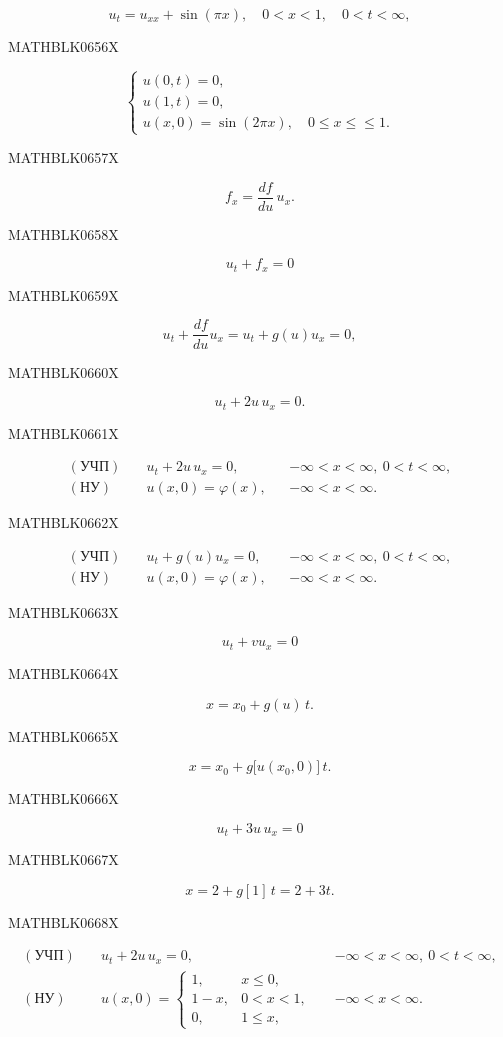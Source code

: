 \documentclass[
  ukrainian,
]{article}
\begin{document}
\[
u_t = u_{xx} + \sin(\pi x), \quad 0 < x < 1, \quad 0 < t < \infty,
\]

MATHBLK0656X

\[
\begin{cases} u(0, t) = 0, \\ u(1, t) = 0, \\ u(x, 0) = \sin(2\pi x), \quad 0 \le x \le \le 1. \end{cases}
\]

MATHBLK0657X

\[
f_x=\frac{df}{du}\,u_x.
\]

MATHBLK0658X

\[
u_t + f_x = 0
\]

MATHBLK0659X

\[
u_t + \frac{df}{du}u_x = u_t + g(u)u_x = 0,
\]

MATHBLK0660X

\[
u_t + 2u\,u_x = 0.
\]

MATHBLK0661X

\[
\begin{aligned}
(\text{УЧП})\quad & u_t + 2u\,u_x = 0, && -\infty < x < \infty,\ 0 < t < \infty, \\
(\text{НУ})\quad & u(x,0)=\varphi(x), && -\infty < x < \infty.
\end{aligned}
\]

MATHBLK0662X

\[
\begin{aligned}
(\text{УЧП})\quad & u_t + g(u)u_x = 0, && -\infty < x < \infty,\ 0 < t < \infty, \\
(\text{НУ})\quad & u(x,0)=\varphi(x), && -\infty < x < \infty.
\end{aligned}
\]

MATHBLK0663X

\[
u_t + v u_x = 0
\]

MATHBLK0664X

\[
x = x_0 + g(u)\,t.
\]

MATHBLK0665X

\[
x = x_0 + g\!\bigl[u(x_0,0)\bigr]\,t.
\]

MATHBLK0666X

\[
u_t + 3u\,u_x = 0
\]

MATHBLK0667X

\[
x = 2 + g[1]\,t = 2 + 3t.
\]

MATHBLK0668X

\[
\begin{aligned}
(\text{УЧП})\quad & u_t + 2u\,u_x = 0, && -\infty < x < \infty,\ 0 < t < \infty, \\
(\text{НУ})\quad &
u(x,0)=
\begin{cases}
1, & x \le 0,\\
1-x, & 0 < x < 1,\\
0, & 1 \le x,
\end{cases}
&& -\infty < x < \infty.
\end{aligned}
\]
\end{document}
